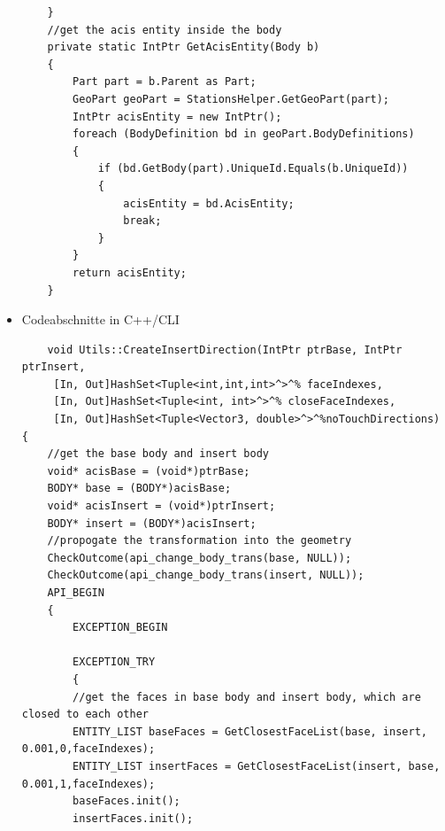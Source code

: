 \documentclass[14pt,a4paper,titlepage]{article}
\begin{document}
\begin{itemize}
\begin{lstlisting}
	}
	//get the acis entity inside the body
	private static IntPtr GetAcisEntity(Body b)
	{
		Part part = b.Parent as Part;
		GeoPart geoPart = StationsHelper.GetGeoPart(part);
		IntPtr acisEntity = new IntPtr();
		foreach (BodyDefinition bd in geoPart.BodyDefinitions)
		{
			if (bd.GetBody(part).UniqueId.Equals(b.UniqueId))
			{
				acisEntity = bd.AcisEntity;
				break;
			}
		}
		return acisEntity;
	}
	\end{lstlisting}
	\item Codeabschnitte in C++/CLI
	\begin{lstlisting}
	void Utils::CreateInsertDirection(IntPtr ptrBase, IntPtr ptrInsert,
	 [In, Out]HashSet<Tuple<int,int,int>^>^% faceIndexes,
	 [In, Out]HashSet<Tuple<int, int>^>^% closeFaceIndexes,
	 [In, Out]HashSet<Tuple<Vector3, double>^>^%noTouchDirections) {
	//get the base body and insert body
	void* acisBase = (void*)ptrBase;
	BODY* base = (BODY*)acisBase;
	void* acisInsert = (void*)ptrInsert;
	BODY* insert = (BODY*)acisInsert;
	//propogate the transformation into the geometry
	CheckOutcome(api_change_body_trans(base, NULL));
	CheckOutcome(api_change_body_trans(insert, NULL));
	API_BEGIN
	{
		EXCEPTION_BEGIN
		
		EXCEPTION_TRY
		{
		//get the faces in base body and insert body, which are closed to each other
		ENTITY_LIST baseFaces = GetClosestFaceList(base, insert, 0.001,0,faceIndexes);
		ENTITY_LIST insertFaces = GetClosestFaceList(insert, base, 0.001,1,faceIndexes);
		baseFaces.init();
		insertFaces.init();
		

\end{lstlisting}
\end{itemize}
\end{document}
